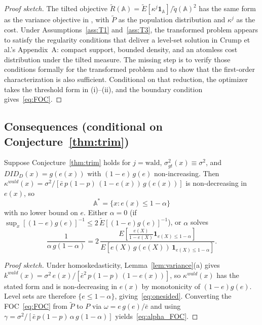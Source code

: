 \begin{proof}[Proof sketch]
The tilted objective $\tilde R(\mathbb A)=\tilde E[\kappa^j\mathbf 1_{\mathbb A}]/\tilde q(\mathbb A)^2$ has the same form as the variance objective in \citet[][eq.~8]{crump2009trimming}, with $\tilde P$ as the population distribution and $\kappa^j$ as the cost. Under Assumptions~\ref{ass:T1} and~\ref{ass:T3}, the transformed problem appears to satisfy the regularity conditions that deliver a level-set solution in Crump et al.'s Appendix~A: compact support, bounded density, and an atomless cost distribution under the tilted measure. The missing step is to verify those conditions formally for the transformed problem and to show that the first-order characterization is also sufficient. Conditional on that reduction, the optimizer takes the threshold form in (i)--(ii), and the boundary condition gives~\eqref{eq:FOC}.
\end{proof}

\subsection{Consequences (conditional on Conjecture~\ref{thm:trim})}

\begin{conjecture}\label{cor:onesided}
Suppose Conjecture~\ref{thm:trim} holds for $j=\text{wald}$, $\sigma^2_{gt}(x)\equiv\sigma^2$, and $DID_D(x)=g(e(x))$ with $(1-e)\,g(e)$ non-increasing. Then $\kappa^{wald}(x)=\sigma^2/[\bar e\,p(1-p)\,(1-e(x))\,g(e(x))]$ is non-decreasing in $e(x)$, so
\begin{equation}\label{eq:onesided}
    \mathbb A^*=\{x:e(x)\le 1-\alpha\}
\end{equation}
with no lower bound on $e$. Either $\alpha=0$ (if $\sup_x[(1-e)g(e)]^{-1}\le 2\,\tilde E[(1-e)g(e)]^{-1}$), or $\alpha$ solves
\begin{equation}\label{eq:alpha_FOC}
    \frac{1}{\alpha\,g(1-\alpha)}=2\,\frac{E\!\left[\tfrac{e(X)}{1-e(X)}\mathbf 1_{e(X)\le 1-\alpha}\right]}{E\!\left[e(X)\,g(e(X))\,\mathbf 1_{e(X)\le 1-\alpha}\right]}.
\end{equation}
\end{conjecture}

\begin{proof}[Proof sketch]
Under homoskedasticity, Lemma~\ref{lem:variance}(a) gives $k^{wald}(x)=\sigma^2\,e(x)/[\bar e^2\,p(1-p)\,(1-e(x))]$, so $\kappa^{wald}(x)$ has the stated form and is non-decreasing in $e(x)$ by monotonicity of $(1-e)g(e)$. Level sets are therefore $\{e\le 1-\alpha\}$, giving~\eqref{eq:onesided}. Converting the FOC~\eqref{eq:FOC} from $\tilde P$ to $P$ via $\omega=e\,g(e)/\bar e$ and using $\gamma=\sigma^2/[\bar e\,p(1-p)\,\alpha\,g(1-\alpha)]$ yields~\eqref{eq:alpha_FOC}.
\end{proof}

